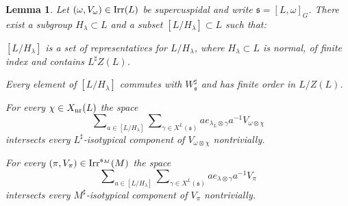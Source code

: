 \documentclass[11pt]{amsart}
\newtheorem{lem}[thm]{Lemma}
\theoremstyle{definition}
\begin{document}
\begin{lem}\label{lem:3.30}
Let $(\omega,V_\omega) \in {{\rm Irr}} (L)$ be supercuspidal and write 
${{\mathfrak s}} = [L,\omega]_G$. There exist a subgroup $H_\lambda \subset L$ and a subset 
$[L / H_\lambda] \subset L$ such that:
{\begin{enumerate} {{
\item $[L / H_\lambda]$ is a set of representatives for $L / H_\lambda$, where
$H_\lambda \subset L$ is normal, of finite index and contains $L^\sharp Z(L)$.
\item Every element of $[L / H_\lambda]$ commutes with $W_{{\mathfrak s}}^\sharp$ and 
has finite order in $L / Z(L)$.
\item For every $\chi \in X_{{\rm nr}} (L)$ the space 
\[
\sum\nolimits_{a \in [L / H_\lambda]} \sum\nolimits_{\gamma \in X^L ({{\mathfrak s}})}
a e_{\lambda_L \otimes \gamma} a^{-1} V_{\omega \otimes \chi}
\]
intersects every $L^\sharp$-isotypical component of $V_{\omega \otimes \chi}$ 
nontrivially.
\item For every $(\pi,V_\pi) \in {{\rm Irr}}^{{{\mathfrak s}}_M}(M)$ the space 
\[
\sum\nolimits_{a \in [L / H_\lambda]} \sum\nolimits_{\gamma \in X^L ({{\mathfrak s}})}
a e_{\lambda \otimes \gamma} a^{-1} V_\pi
\]
intersects every $M^\sharp$-isotypical component of $V_\pi$ nontrivially.
}} \end{enumerate}}
\end{lem}
\end{document}
